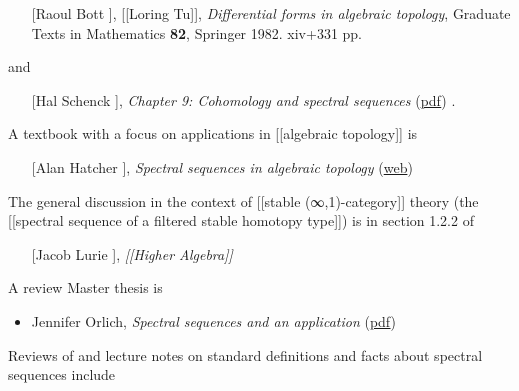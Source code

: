 \documentclass[12pt,titlepage]{article}
\theoremstyle{plain}
\theoremstyle{definition}
\theoremstyle{remark}
\begin{document}
\begin{itemize}%
\item [[Raoul Bott]], [[Loring Tu]], \emph{Differential forms in algebraic topology}, Graduate Texts in Mathematics \textbf{82}, Springer 1982. xiv+331 pp.

\end{itemize}
and

\begin{itemize}%
\item [[Hal Schenck]], \emph{Chapter 9: Cohomology and spectral sequences} (\href{http://www.math.uiuc.edu/~schenck/tapp.pdf}{pdf}) .

\end{itemize}
A textbook with a focus on applications in [[algebraic topology]] is

\begin{itemize}%
\item [[Alan Hatcher]], \emph{Spectral sequences in algebraic topology} (\href{http://www.math.cornell.edu/~hatcher/SSAT/SSATpage.html}{web})

\end{itemize}
The general discussion in the context of [[stable (∞,1)-category]] theory (the [[spectral sequence of a filtered stable homotopy type]]) is in section 1.2.2 of

\begin{itemize}%
\item [[Jacob Lurie]], \emph{[[Higher Algebra]]}

\end{itemize}
A review Master thesis is

\begin{itemize}%
\item Jennifer Orlich, \emph{Spectral sequences and an application} (\href{http://www.math.osu.edu/~flicker.1/orlich.pdf}{pdf})

\end{itemize}
Reviews of and lecture notes on standard definitions and facts about spectral sequences include
\end{document}

